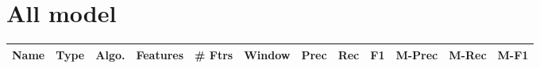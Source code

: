 \documentclass[a4paper]{article}
\begin{document}
\begin{landscape}
\begin{center}
\begin{tabular}{ |c|c|c|c|c|c|c|c|c|c|c|c|}
 	
 
 	
 
 	
 
 	
 
 	
 
 	
 
 	
 
 	
 
 	
 
 	
 
 	
 
 	
 
 	
 
 	
 
 	
 
 	
 
 	
 
 	
 
 	
 
 	
 
 	
 
 	
 
 	
 
 	
 
 	
 
 	
 
 	
 
 	
 
 	
 
 	
 
 	
 
 	
 
 	
 
 	
 
 	
 
 	
 
 	
 
 	
 
 	
 
 	
 
 	
 
 	
 
 \hline
\end{tabular}
\end{center}



\section{All model }


\begin{center}
\begin{tabular}{ |c|c|c|c|c|c|c|c|c|c|c|c|} 
 \hline
 	Name & Type & Algo. & Features & \# Ftrs & Window & Prec & Rec & F1 & M-Prec & M-Rec & M-F1\\
 \hline
 

\end{tabular}
\end{center}
\end{landscape}
\end{document}
